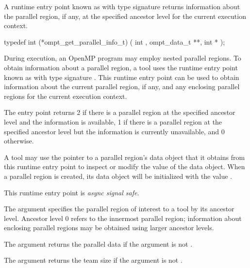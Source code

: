 \label{sec:ompt_get_parallel_info_t}
\label{sec:ompt_get_parallel_info}

\summary

A runtime entry point known as 
with type signature 
returns information about
the parallel region, if any, at the specified ancestor level
for the current execution context.

\format
\begin{ccppspecific}
\begin{omptInquiry}
typedef int (*ompt_get_parallel_info_t) (
  int ,
  ompt_data_t **,
  int *
);
\end{omptInquiry}
\end{ccppspecific}

\descr
During execution, an OpenMP program may employ nested parallel
regions.
To obtain information about a parallel region,
a tool uses the runtime entry point known as
with type signature .
This runtime entry point
can be used to obtain information about the current parallel region,
if any, and any enclosing parallel regions
for the current execution context.

The entry point returns 2 if there is a parallel region at the
specified ancestor level and the information is available,
1 if there is a parallel region at the specified ancestor level
but the information is currently unavailable, and 0 otherwise.

A tool may use the pointer to a parallel region's data object that it
obtains from this runtime entry point to inspect or modify the value
of the data object.  When a parallel region is created, its data
object will be initialized with the value .

This runtime entry point is \emph{async signal safe}.

\argdesc

The argument  specifies the parallel region
of interest to a tool by its ancestor level.  Ancestor level 0 refers
to the innermost parallel region; information about enclosing parallel
regions may be obtained using larger ancestor levels.

The argument  returns the parallel data
if the argument is not .

The argument  returns the team size if the argument is
not .

